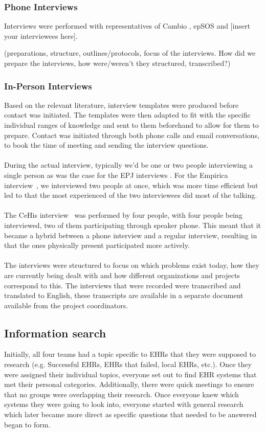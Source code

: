 \documentclass[14pt]{article}
\begin{document}
\subsubsection{Phone Interviews}

Interviews were performed with representatives of Cambio \cite{Cambio}, epSOS \cite{epSOS} and [insert your interviewees here].

(preparations, structure, outlines/protocols, focus of the interviews.
How did we prepare the interviews, how were/weren't they structured, transcribed?)

\subsubsection{In-Person Interviews}

Based on the relevant literature, interview templates were produced before contact was initiated. The templates were then adapted to fit with the specific individual ranges of knowledge and sent to them beforehand to allow for them to prepare. Contact was initiated through both phone calls and email conversations, to book the time of meeting and sending the interview questions.
\\\\
During the actual interview, typically we'd be one or two people interviewing a single person as was the case for the EPJ interviews \cite{EPJ1} \cite{EPJ2}. For the Empirica interview~\cite{Empirica}, we interviewed two people at once, which was more time efficient but led to that the most experienced of the two interviewees did most of the talking.
\\\\
The CeHis interview~\cite{CeHis} was performed by four people, with four people being interviewed, two of them participating through speaker phone. This meant that it became a hybrid between a phone interview and a regular interview, resulting in that the ones physically present participated more actively. 
\\\\
The interviews were structured to focus on which problems exist today, how they are currently being dealt with and how different organizations and projects correspond to this. The interviews that were recorded were transcribed and translated to English, these transcripts are available in a separate document available from the project coordinators.

\subsection{Information search}
Initially, all four teams had a topic specific to \glspl{EHR} that they were supposed to research (e.g. Successful \glspl{EHR}, \glspl{EHR} that failed, local \glspl{EHR}, etc.).  Once they were assigned their individual topics, everyone set out to find \gls{EHR} systems that met their personal categories.  Additionally, there were quick meetings to ensure that no groups were overlapping their research.  Once everyone knew which systems they were going to look into, everyone started with general research which later became more direct as specific questions that needed to be answered began to form.
\end{document}
